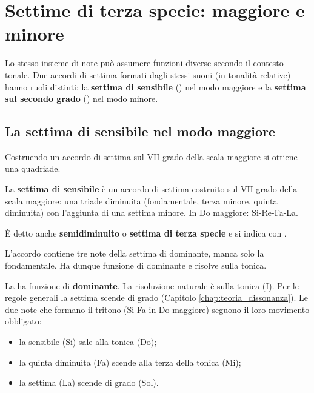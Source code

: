\chapter{Settime di terza specie:  maggiore e  minore}
\label{chap:vii7_ii7}

Lo stesso insieme di note può assumere funzioni diverse secondo il contesto tonale. Due accordi di settima formati dagli stessi suoni (in tonalità relative) hanno ruoli distinti: la \textbf{settima di sensibile} () nel modo maggiore e la \textbf{settima sul secondo grado} () nel modo minore.

\section{La settima di sensibile nel modo maggiore}
\label{sec:vii7_maggiore}

Costruendo un accordo di settima sul VII grado della scala maggiore si ottiene una quadriade.

\begin{definizione}
	\label{def:vii7}
	La \textbf{settima di sensibile} è un accordo di settima costruito sul VII grado della scala maggiore: una triade diminuita (fondamentale, terza minore, quinta diminuita) con l'aggiunta di una settima minore. In Do maggiore: Si-Re-Fa-La.

	È detto anche \textbf{semidiminuito} o \textbf{settima di terza specie} e si indica con .
\end{definizione}

L'accordo contiene tre note della settima di dominante, manca solo la fondamentale. Ha dunque funzione di dominante e risolve sulla tonica.

\begin{regola}
	\label{reg:funzione_vii7}
	La  ha funzione di \textbf{dominante}. La risoluzione naturale è sulla tonica (I). Per le regole generali la settima scende di grado (Capitolo \ref{chap:teoria_dissonanza}). Le due note che formano il tritono (Si-Fa in Do maggiore) seguono il loro movimento obbligato:
	\begin{itemize}
		\item la sensibile (Si) sale alla tonica (Do);
		\item la quinta diminuita (Fa) scende alla terza della tonica (Mi);
		\item la settima (La) scende di grado (Sol).
	\end{itemize}
\end{regola}

